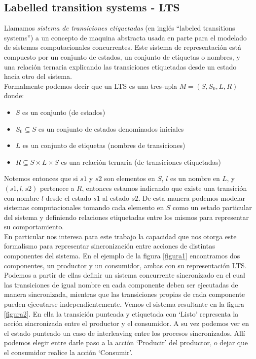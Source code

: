 \documentclass[titlepage, 12pt]{book}
\begin{document}
\subsection*{Labelled transition systems - LTS}

Llamamos \textit{sistema de transiciones etiquetadas} (en ingl\'es ``labeled transitions systems'') a un concepto de maquina abstracta usada en parte para el modelado de sistemas computacionales concurrentes. Este sistema de representaci\'on est\'a compuesto por un conjunto de estados, un conjunto de etiquetas o nombres, y una relaci\'on ternaria explicando las transiciones etiquetadas desde un estado hacia otro del sistema.\\

Formalmente podemos decir que un LTS es una tres-upla $M = (S,S_{0},L,R)$ donde:
\begin{itemize}
\item $S$ es un conjunto (de estados)
\item $S_0 \subseteq S$ es un conjunto de estados denominados iniciales
\item $L$ es un conjunto de etiquetas (nombres de transiciones)
\item $R \subseteq S \times L \times S$ es una relaci\'on ternaria (de transiciones etiquetadas)
\end{itemize}
Notemos entonces que si $s1$ y $s2$ son elementos en $S$, $l$ es un nombre en $L$, y $(s1,l,s2)$ pertenece a $R$, entonces estamos indicando que existe una transici\'on con nombre $l$ desde el estado $s1$ al estado $s2$. De esta manera podemos modelar sistemas computacionales tomando cada elemento en $S$ como un estado particular del sistema y definiendo relaciones etiquetadas entre los mismos para representar su comportamiento.\\

En particular nos interesa para este trabajo la capacidad que nos otorga este formalismo para representar sincronizaci\'on entre acciones de distintas componentes del sistema. En el ejemplo de la figura \ref{figura1} encontramos dos componentes, un productor y un consumidor, ambas con su representaci\'on LTS. Podemos a partir de ellas definir un sistema concurrente sincronizado en el cual las transiciones de igual nombre en cada componente deben ser ejecutadas de manera sincronizada, mientras que las transiciones propias de cada componente pueden ejecutarse independientemente. Vemos el sistema resultante en la figura \ref{figura2}. En ella la transici\'on punteada y etiquetada con `Listo' representa la acci\'on sincronizada entre el productor y el consumidor. A su vez podemos ver en el estado punteado un caso de interleaving entre los procesos sincronizados. All\'i podemos elegir entre darle paso a la acci\'on `Producir' del productor, o dejar que el consumidor realice la acci\'on `Consumir'. 
\end{document}
